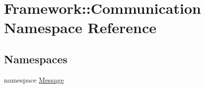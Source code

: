 \hypertarget{namespaceFramework_1_1Communication}{
\section{Framework::Communication Namespace Reference}
\label{namespaceFramework_1_1Communication}
}
\subsection*{Namespaces}
\begin{DoxyCompactItemize}
\item 
namespace \hyperlink{namespaceFramework_1_1Communication_1_1Message}{Message}
\end{DoxyCompactItemize}
